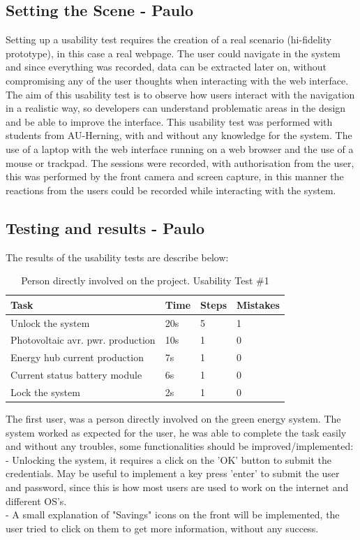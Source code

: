 \subsection{Setting the Scene - Paulo}
Setting up a usability test requires the creation of a real scenario (hi-fidelity prototype), in this case a real webpage. The user could navigate in the system and since everything was recorded, data can be extracted later on, without compromising any of the user thoughts when interacting with the web interface.\p
The aim of this usability test is to observe how users interact with the navigation in a realistic way, so developers can understand problematic areas in the design and be able to improve the interface.\p
This usability test was performed with students from AU-Herning, with and without any knowledge for the system. The use of a laptop with the web interface running on a web browser and the use of a mouse or trackpad. The sessions were recorded, with authorisation from the user, this was performed by the front camera and screen capture, in this manner the reactions from the users could be recorded while interacting with the system.\p

\subsection{Testing and results - Paulo}

The results of the usability tests are describe below:

\begin{table}[H]
	\begin{tabular}{ | l | l | l | l |}
		\hline
		Task 				 	     & 		Time 	& 	Steps 	& 	Mistakes 		\\ \hline
		Unlock the system    			     & 		20s  		& 	 5 		& 	1 			\\ \hline
		Photovoltaic avr. pwr. production  & 		10s 		& 	 1 		& 	0 			\\ \hline
		Energy hub current production 	     & 		7s 		& 	 1 		& 	0			 \\ \hline
		Current status battery module 	     & 		6s 		& 	 1 		& 	0 			 \\ \hline
		Lock the system 			     & 		2s 		& 	 1 		& 	0 			 \\ \hline
	\end{tabular}
    \caption{Person directly involved on the project. Usability Test \#1}
\end{table}
The first user, was a person directly involved on the green energy system. The system worked as expected for the user, he was able to complete the task easily and without any troubles, some functionalities should be improved/implemented:\\
- Unlocking the system, it requires a click on the 'OK' button to submit the credentials. May be useful to implement a key press 'enter' to submit the user and password, since this is how most users are used to work on the internet and different OS's.\\
- A small explanation of "Savings" icons on the front will be implemented, the user tried to click on them to get more information, without any success.\\

